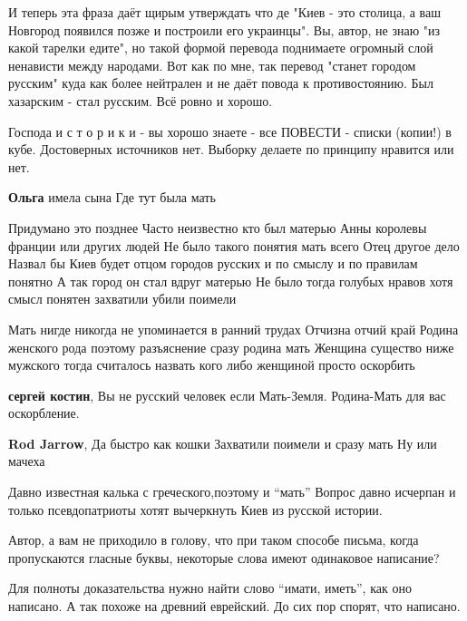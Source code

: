 \begin{itemize}
И теперь эта фраза даёт щирым утверждать что де "Киев - это столица, а ваш
Новгород появился позже и построили его украинцы". Вы, автор, не знаю "из какой
тарелки едите", но такой формой перевода поднимаете огромный слой ненависти
между народами. Вот как по мне, так перевод "станет городом русским" куда как
более нейтрален и не даёт повода к противостоянию. Был хазарским - стал
русским. Всё ровно и хорошо.


Господа и с т о р и к и - вы хорошо знаете - все ПОВЕСТИ - списки (копии!) в
кубе. Достоверных источников нет. Выборку делаете по принципу нравится или нет.

\textbf{Ольга} имела сына Где тут была мать


Придумано это позднее Часто неизвестно кто был матерью Анны королевы франции
или других людей Не было такого понятия мать всего Отец другое дело Назвал бы
Киев будет отцом городов русских и по смыслу и по правилам понятно А так город
он стал вдруг матерью Не было тогда голубых нравов хотя смысл понятен захватили
убили поимели


Мать нигде никогда не упоминается в ранний трудах Отчизна отчий край Родина
женского рода поэтому разъяснение сразу родина мать Женщина существо ниже
мужского тогда считалось назвать кого либо женщиной просто оскорбить

\begin{itemize} %
\textbf{сергей костин}, Вы не русский человек если Мать-Земля. Родина-Мать для вас оскорбление.

\textbf{Rod Jarrow}, Да быстро как кошки Захватили поимели и сразу мать Ну или мачеха
\end{itemize} %


Давно известная калька с греческого,поэтому и \enquote{мать} Вопрос давно исчерпан и
только псевдопатриоты хотят вычеркнуть Киев из русской истории.


Автор, а вам не приходило в голову, что при таком способе письма, когда
пропускаются гласные буквы, некоторые слова имеют одинаковое написание?

Для полноты доказательства нужно найти слово \enquote{имати, иметь}, как оно написано.
А так похоже на древний еврейский. До сих пор спорят, что написано.


\end{itemize}
